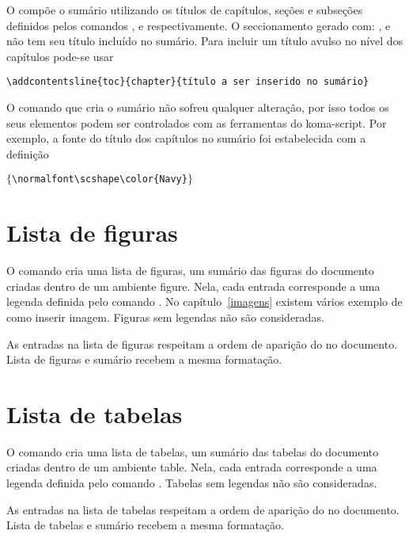 O  compõe o sumário utilizando os títulos
de capítulos, seções e subseções definidos pelos comandos ,
 e  respectivamente. O
seccionamento gerado com: , 
e  não tem seu título incluído no sumário.
Para incluir um título avulso no nível dos capítulos pode-se usar
\begin{tcolorbox}
\begin{lstlisting}
\addcontentsline{toc}{chapter}{título a ser inserido no sumário}
\end{lstlisting}
\end{tcolorbox}

O comando  que cria o sumário não sofreu qualquer
alteração, por isso todos os seus elementos podem ser controlados com
as ferramentas do koma-script. Por exemplo, a fonte do título dos
capítulos no sumário foi estabelecida com a definição
\begin{center}
 $\{$\verb|\normalfont\scshape\color{Navy}|$\}$
\end{center}

\section{Lista de figuras}

O comando  cria uma lista de figuras, um
sumário das figuras do documento criadas dentro de um ambiente
figure. Nela, cada entrada corresponde a uma legenda definida
pelo comando . No capítulo~\ref{imagens} existem 
vários exemplo de como inserir imagem. Figuras sem legendas não são
consideradas.

As entradas na lista de figuras respeitam a ordem de aparição do
 no documento.  Lista de figuras e sumário recebem a 
mesma formatação.

\section{Lista de tabelas}

O comando  cria uma lista de tabelas, um
sumário das tabelas do documento criadas dentro de um
ambiente table. Nela, cada entrada corresponde a uma legenda
definida pelo comando . Tabelas sem legendas
não são consideradas.

As entradas na lista de tabelas respeitam a ordem de aparição do
 no documento. Lista de tabelas e sumário recebem a 
mesma formatação.

